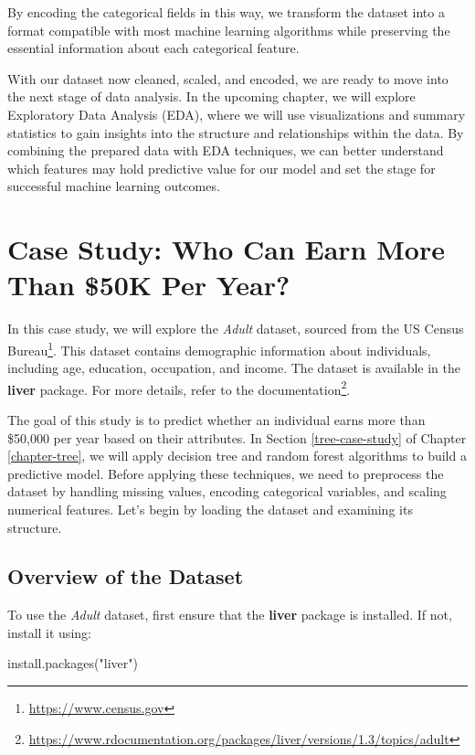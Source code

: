 \documentclass[
  11pt,
]{book}
\makeatletter
\newenvironment{Shaded}{}{}
\newcommand{\FunctionTok}[1]{#1}
\newcommand{\NormalTok}[1]{#1}
\newcommand{\StringTok}[1]{\textcolor[rgb]{0.39,0.39,0.39}{#1}}
\renewcommand{\href}[2]{#2\footnote{\url{#1}}}
\newenvironment{kframe}{%
\medskip{}
\setlength{\fboxsep}{.8em}
 \def\at@end@of@kframe{}%
 \ifinner\ifhmode%
  \def\at@end@of@kframe{\end{minipage}}%
  \begin{minipage}{\columnwidth}%
 \fi\fi%
 \def\FrameCommand##1{\hskip\@totalleftmargin \hskip-\fboxsep
 \colorbox{shadecolor}{##1}\hskip-\fboxsep
     \hskip-\linewidth \hskip-\@totalleftmargin \hskip\columnwidth}%
 \MakeFramed {\advance\hsize-\width
   \@totalleftmargin\z@ \linewidth\hsize
   \@setminipage}}%
 {\par\unskip\endMakeFramed%
 \at@end@of@kframe}
\renewenvironment{Shaded}{\begin{kframe}}{\end{kframe}}
\theoremstyle{definition}
\theoremstyle{definition}
\theoremstyle{definition}
\theoremstyle{definition}
\theoremstyle{remark}
\makeatother
\begin{document}
By encoding the categorical fields in this way, we transform the dataset into a format compatible with most machine learning algorithms while preserving the essential information about each categorical feature.

With our dataset now cleaned, scaled, and encoded, we are ready to move into the next stage of data analysis. In the upcoming chapter, we will explore Exploratory Data Analysis (EDA), where we will use visualizations and summary statistics to gain insights into the structure and relationships within the data. By combining the prepared data with EDA techniques, we can better understand which features may hold predictive value for our model and set the stage for successful machine learning outcomes.

\section{Case Study: Who Can Earn More Than \$50K Per Year?}\label{Data-pre-adult}

In this case study, we will explore the \emph{Adult} dataset, sourced from the \href{https://www.census.gov}{US Census Bureau}. This dataset contains demographic information about individuals, including age, education, occupation, and income. The dataset is available in the \textbf{liver} package. For more details, refer to the \href{https://www.rdocumentation.org/packages/liver/versions/1.3/topics/adult}{documentation}.

The goal of this study is to predict whether an individual earns more than \$50,000 per year based on their attributes. In Section \ref{tree-case-study} of Chapter \ref{chapter-tree}, we will apply decision tree and random forest algorithms to build a predictive model. Before applying these techniques, we need to preprocess the dataset by handling missing values, encoding categorical variables, and scaling numerical features. Let's begin by loading the dataset and examining its structure.

\subsection*{Overview of the Dataset}\label{overview-of-the-dataset}


To use the \emph{Adult} dataset, first ensure that the \textbf{liver} package is installed. If not, install it using:

\begin{Shaded}
\begin{Highlighting}[]
\FunctionTok{install.packages}\NormalTok{(}\StringTok{"liver"}\NormalTok{)}
\end{Highlighting}
\end{Shaded}
\end{document}
